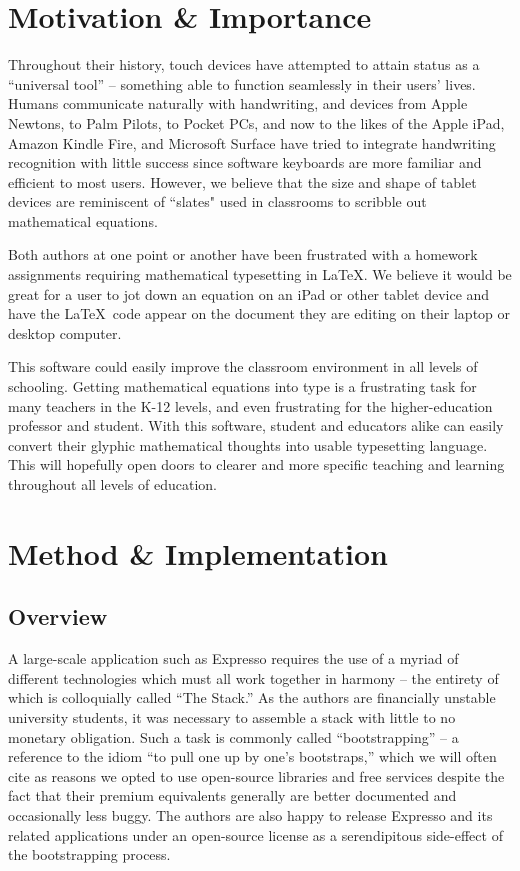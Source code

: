 \documentclass{acm_proc_article-sp}
\begin{document}
\section{Motivation \& Importance}
Throughout their history, touch devices have attempted to attain status as a ``universal tool'' -- something able to function seamlessly in their users' lives. Humans communicate naturally with handwriting, and devices from Apple Newtons, to Palm Pilots, to Pocket PCs, and now to the likes of the Apple iPad, Amazon Kindle Fire, and Microsoft Surface have tried to integrate handwriting recognition with little success since software keyboards are more familiar and efficient to most users. However, we believe that the size and shape of tablet devices are reminiscent of ``slates" used in classrooms to scribble out mathematical equations.

Both authors at one point or another have been frustrated with a homework assignments requiring mathematical typesetting in \LaTeX.  We believe it would be great for a user to jot down an equation on an iPad or other tablet device and have the \LaTeX\ code appear on the document they are editing on their laptop or desktop computer.

This software could easily improve the classroom environment in all levels of schooling. Getting mathematical equations into type is a frustrating task for many teachers in the K-12 levels, and even frustrating for the higher-education professor and student. With this software, student and educators alike can easily convert their glyphic mathematical thoughts into usable typesetting language. This will hopefully open doors to clearer and more specific teaching and learning throughout all levels of education.

\section{Method \& Implementation}

\subsection{Overview}
A large-scale application such as Expresso requires the use of a myriad of different technologies which must all work together in harmony --
the entirety of which is colloquially called ``The Stack.'' As the authors are financially unstable university students, it was necessary to
assemble a stack with little to no monetary obligation. Such a task is commonly called ``bootstrapping'' -- a reference to the idiom ``to pull one up by one's bootstraps,'' which we will often cite as reasons we opted to use open-source libraries and free services despite the fact that their premium equivalents generally are better documented and occasionally less buggy. The authors are also happy to release Expresso and its related applications under an open-source license as a serendipitous side-effect of the bootstrapping process.
\end{document}
